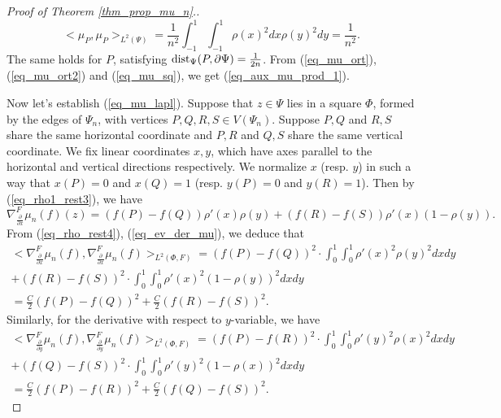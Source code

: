 \documentclass[12pt]{article}
\numberwithin{equation}{section}
\theoremstyle{theorem}
\theoremstyle{definition}
\theoremstyle{remark}
\newcommand{\dist}{{\rm{dist}}}
\newcommand{\scal}[2]{\big< #1, #2 \big>}
\begin{document}
\begin{proof}[Proof of Theorem  \ref{thm_prop_mu_n}.]
		\begin{equation}\label{eq_mu_sq}
			\scal{\mu_P}{\mu_P}_{L^2(\Psi)}  = \frac{1}{n^2} \int_{-1}^{1} \int_{-1}^{1} \rho(x)^2 dx \rho(y)^2 dy = \frac{1}{n^2}.
		\end{equation}
		The same holds for $P$, satisfying $\dist_{\Psi}(P, \partial \Psi) = \frac{1}{2n}$. 
		From (\ref{eq_mu_ort}), (\ref{eq_mu_ort2}) and (\ref{eq_mu_sq}), we get (\ref{eq_aux_mu_prod_1}).
		\par Now let's establish (\ref{eq_mu_lapl}).
		Suppose that $z \in \Psi$ lies in a square $\Phi$, formed by the edges of $\Psi_n$, with vertices $P, Q, R, S \in V(\Psi_n)$.
		Suppose $P, Q$ and $R, S$ share the same horizontal coordinate and $P, R$ and $Q, S$ share the same vertical coordinate.
		We fix linear coordinates $x, y$, which have axes parallel to the horizontal and vertical directions respectively. 
		We normalize $x$ (resp. $y$) in such a way that $x(P) = 0$ and $x(Q) = 1$ (resp. $y(P) = 0$ and $y(R) = 1$).
		Then by (\ref{eq_rho1_rest3}), we have
		\begin{equation}\label{eq_ev_der_mu}
			 \nabla_{\frac{\partial}{\partial x}}^{F} \mu_n(f)(z) = (f(P) - f(Q))\rho'(x) \rho(y) + (f(R) - f(S))\rho'(x) (1 - \rho(y)).
		\end{equation}
		From (\ref{eq_rho_rest4}), (\ref{eq_ev_der_mu}), we deduce that
		\begin{multline}\label{eq_prop_mufin_1}
			\scal{\nabla_{\frac{\partial}{\partial x}}^{F} \mu_n(f)}{\nabla_{\frac{\partial}{\partial x}}^{F} \mu_n(f)}_{L^2(\Phi, F)} = 
			(f(P) - f(Q))^2 \cdot \int_{0}^{1} \int_{0}^{1} \rho'(x)^2 \rho(y)^2 dx dy
			\\
			+
			(f(R) - f(S))^2 \cdot \int_{0}^{1} \int_{0}^{1} \rho'(x)^2 (1-\rho(y))^2 dx dy
			\\
			=
			\frac{C}{2}(f(P) - f(Q))^2 + \frac{C}{2}(f(R) - f(S))^2. 
		\end{multline}
		Similarly, for the derivative with respect to $y$-variable, we have
		\begin{multline}\label{eq_prop_mufin_2}
			\scal{\nabla_{\frac{\partial}{\partial y}}^{F} \mu_n(f)}{\nabla_{\frac{\partial}{\partial y}}^{F} \mu_n(f)}_{L^2(\Phi, F)} = 
			(f(P) - f(R))^2 \cdot \int_{0}^{1} \int_{0}^{1} \rho'(y)^2 \rho(x)^2 dx dy
			\\
			+
			(f(Q) - f(S))^2 \cdot \int_{0}^{1} \int_{0}^{1} \rho'(y)^2 (1-\rho(x))^2 dx dy
			\\
			=
			\frac{C}{2}(f(P) - f(R))^2 + \frac{C}{2}(f(Q) - f(S))^2. 
		\end{multline}

\end{proof}
\end{document}
